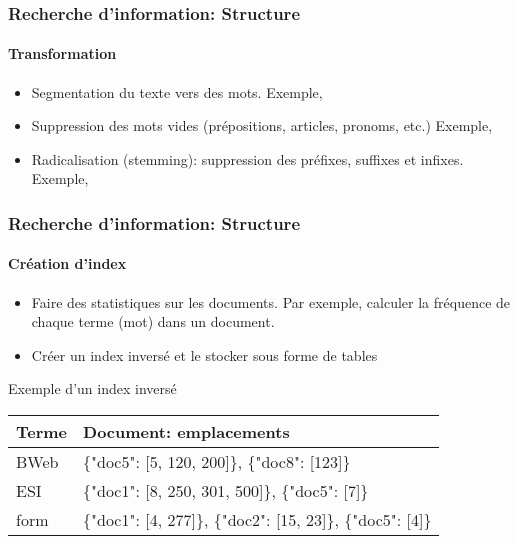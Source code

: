 \documentclass[xcolor=table]{beamer}
\begin{document}
\begin{frame}
\frametitle{Recherche d'information: Structure}
\framesubtitle{Transformation}

\begin{itemize}
	\item Segmentation du texte vers des mots. 
	Exemple, 
	
	\item Suppression des mots vides (prépositions, articles, pronoms, etc.)
	Exemple, 
	
	\item Radicalisation (stemming): suppression des préfixes, suffixes et infixes. 
	Exemple, 
\end{itemize}

\end{frame}

\begin{frame}
\frametitle{Recherche d'information: Structure}
\framesubtitle{Création d'index}

\begin{itemize}
	\item Faire des statistiques sur les documents. 
	Par exemple, calculer la fréquence de chaque terme (mot) dans un document. 
	\item Créer un index inversé et le stocker sous forme de tables
\end{itemize}

\begin{exampleblock}{Exemple d'un index inversé}
	\begin{tabular}{|l|l|}
		\hline
		\textbf{Terme} & \textbf{Document: emplacements} \\
		\hline
		BWeb & \{"doc5": [5, 120, 200]\}, \{"doc8": [123]\} \\\hline
		ESI & \{"doc1": [8, 250, 301, 500]\}, \{"doc5": [7]\}\\\hline
		form & \{"doc1": [4, 277]\}, \{"doc2": [15, 23]\}, \{"doc5": [4]\}\\
		\hline
	\end{tabular}
\end{exampleblock}

\end{frame}
\end{document}
